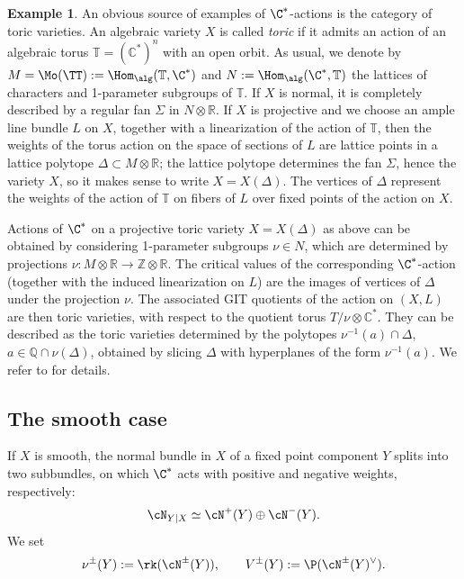 \documentclass[reqno]{amsproc}
\theoremstyle{definition}
\newtheorem{example}[theorem]{Example}
\begin{document}
\begin{example}\label{ex:toric}
An obvious source of examples of $\C^*$-actions is the category of toric varieties. An algebraic variety $X$ is called {\em toric} if it admits an action of an algebraic torus $\mathbb{T}=(\mathbb{C}^*)^n$ with an open orbit. As usual, we denote by $M=\Mo(\TT):=\Hom_{\alg}(\mathbb{T},\C^*)$ and $N:=\Hom_{\alg}(\C^*,\mathbb{T})$ the lattices of characters and 1-parameter subgroups of $\mathbb{T}$. If $X$ is normal, it is completely described by a regular fan $\Sigma$ in $N\otimes\mathbb{R}$.  
If $X$ is projective and we choose an ample line bundle $L$ on $X$, together with a linearization of the action of $\mathbb{T}$, then the weights of the torus action on the space of sections of $L$ are lattice points in a lattice polytope $\Delta\subset M\otimes\mathbb{R}$; the lattice polytope determines the fan $\Sigma$, hence the variety $X$, so it makes sense to write $X=X(\Delta)$. The vertices of $\Delta$ represent the weights of the action of $\mathbb{T}$ on fibers of $L$ over fixed points of the action on $X$. 
  
Actions of $\C^*$ on a projective toric variety $X=X(\Delta)$ as above can be  obtained by considering 1-parameter subgroups $\nu\in N$, which are determined by projections $\nu: M\otimes\mathbb{R}\rightarrow\mathbb{Z}\otimes\mathbb{R}$. The critical values of the corresponding $\C^*$-action (together with the induced linearization on $L$) are the images of vertices of $\Delta$ under the projection $\nu$. The associated GIT quotients of the action on $(X,L)$ are then toric varieties, with respect to the quotient torus $T/\nu\otimes\mathbb{C}^*$. They can be described as the toric varieties determined by the polytopes $\nu^{-1}(a)\cap\Delta$, $a\in\mathbb{Q}\cap\nu(\Delta)$, obtained by slicing $\Delta$ with hyperplanes of the form $\nu^{-1}(a)$. We refer to \cite{KSZ} for details.
\end{example}


\subsection{The smooth case}\label{sssec:BBsmooth}
If $X$ is smooth, the normal bundle in $X$ of a fixed point component $Y$  splits into two subbundles, on which $\C^*$ acts with positive and negative weights, respectively:
\begin{equation}
\cN_{Y|X}\simeq \cN^+(Y)\oplus \cN^-(Y).
\label{eq:normal+-}
\end{equation}
We set
\begin{equation}\label{eq:Vpm}
\nu^{\pm}(Y):=\rk (\cN^{\pm}(Y)), \qquad 
V^\pm(Y):=\P(\cN^{\pm}(Y)^\vee).
\end{equation}
\end{document}
